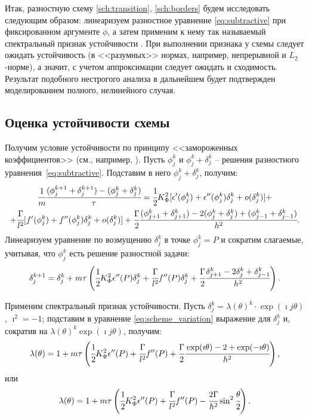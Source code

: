 Итак, разностную схему \eqref{sch:transition}, \eqref{sch:borders} будем исследовать следующим образом: линеаризуем разностное уравнение \eqref{eq:subtractive} при фиксированном аргументе $\phi$, а затем применим к нему так называемый спектральный признак устойчивости \cite{bahvalov_computational_methods}. При выполнении признака у схемы следует ожидать устойчивость (в <<разумных>> нормах, например, непрерывной и $L_2$-норме), а значит, с учетом аппроксимации следует ожидать и сходимость. Результат подобного нестрогого анализа в дальнейшем будет подтвержден моделированием полного, нелинейного случая.


\subsection{Оценка устойчивости схемы}

Получим условие устойчивости по принципу <<замороженных коэффициентов>> (см., например, \cite{bahvalov_computational_methods}). Пусть $\phi_j^k$ и $\phi_j^k + \delta_j^k$ -- решения разностного уравнения~\eqref{eq:subtractive}. Подставим в него $\phi_j^k + \delta_j^k$, получим:
\begin{multline*}
	\cfrac{1}{m} \cfrac{(\phi_j^{k + 1} + \delta_j^{k + 1}) - (\phi_j^k + \delta_j^k)}{\tau} = \cfrac{1}{2} K_\Phi^2 [\epsilon'(\phi_j^k) + \epsilon''(\phi_j^k) \delta_j^k + o(\delta_j^k)] + \\ + \cfrac{\Gamma}{l^2} [f'(\phi_j^k) + f''(\phi_j^k) \delta_j^k + o(\delta_j^k)] + \cfrac{\Gamma}{2} \cfrac{(\phi_{j + 1}^k + \delta_{j + 1}^k) - 2 (\phi_j^k + \delta_j^k) + (\phi_{j - 1}^k + \delta_{j - 1}^k)}{h^2} {\text{.}}
\end{multline*}
Линеаризуем уравнение по возмущению $\delta_j^k$ в точке $\phi_j^k = P$ и сократим слагаемые, учитывая, что $\phi_j^k$ есть решение разностной задачи:
\begin{equation}
	\delta_j^{k + 1} = \delta_j^k + m \tau \left( \cfrac{1}{2} K_\Phi^2 \epsilon''(P) \delta_j^k + \cfrac{\Gamma}{l^2} f''(P) \delta_j^k + \cfrac{\Gamma}{2} \cfrac{{\delta}_{j + 1}^k - 2 {\delta}_j^k + {\delta}_{j - 1}^k}{h^2} \right) {\text{.}}
	\label{eq:scheme_variation}
\end{equation} 

Применим спектральный признак устойчивости. Пусть $\delta_j^k = \lambda(\theta)^k \cdot \exp(\imath j \theta)$, $\imath^2 = -1$; подставим в уравнение \eqref{eq:scheme_variation} выражение для $\delta_j^k$ и, сократив на $\lambda(\theta)^k \exp(\imath j \theta)$, получим:
$$\lambda(\theta) = 1 + m \tau \left( \cfrac{1}{2} K_\Phi^2 \epsilon''(P) + \cfrac{\Gamma}{l^2} f''(P) + \cfrac{\Gamma}{2} \cfrac{\exp(\imath \theta) - 2 + \exp(-\imath \theta)}{h^2} \right) {\text{,}}$$
или
\begin{equation}
	\lambda(\theta) = 1 + m \tau \left( \cfrac{1}{2} K_\Phi^2 \epsilon''(P) + \cfrac{\Gamma}{l^2} f''(P) - \cfrac{2 \Gamma}{h^2} \sin^2 \cfrac{\theta}{2} \right) {\text{.}}
	\label{eq:spectral}
\end{equation}

